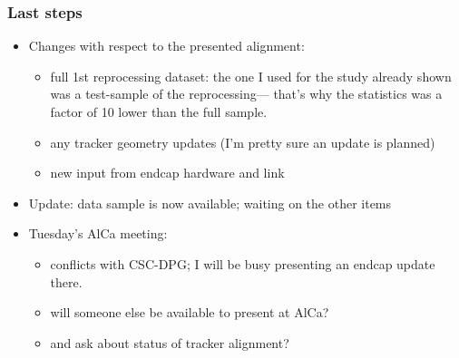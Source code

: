 \documentclass[compress]{beamer}
\begin{document}
\begin{frame}
\frametitle{Last steps}

\begin{itemize}
\item Changes with respect to the presented alignment:
\begin{itemize}
\item full 1st reprocessing dataset: the one I used for the study already
shown was a test-sample of the reprocessing--- that's why the statistics
was a factor of 10 lower than the full sample.
\item any tracker geometry updates (I'm pretty sure an update is planned)
\item new input from endcap hardware and link
\end{itemize}

\item Update: data sample is now available; waiting on the other items

\item Tuesday's AlCa meeting:
\begin{itemize}
\item conflicts with CSC-DPG; I will be busy presenting an endcap update there.
\item will someone else be available to present at AlCa?
\item and ask about status of tracker alignment?
\end{itemize}
\end{itemize}

\label{numpages}
\end{frame}

\end{document}
